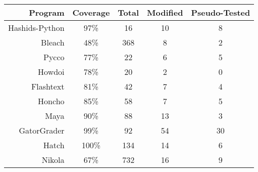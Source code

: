 \renewcommand{\arraystretch}{1.2}

\begin{table}[H]
\centering

%
\huge

\begin{tabular}{rcccc}


  Program & Coverage & Total & Modified & Pseudo-Tested \\
  \toprule

  Hashids-Python & 97\% & 16 & 10 & 8 \\

  Bleach & 48\% & 368 & 8 & 2 \\

  Pycco & 77\% & 22 & 6 & 5 \\

  Howdoi & 78\% & 20 & 2 & 0 \\

  Flashtext & 81\% & 42 & 7 & 4 \\

  Honcho & 85\% & 58 & 7 & 5 \\

  Maya & 90\% & 88 & 13 & 3 \\

  GatorGrader & 99\% & 92 & 54 & 30 \\

  Hatch & 100\% & 134 & 14 & 6 \\

  Nikola & 67\% & 732 & 16 & 9 \\

  \bottomrule

\end{tabular}

\end{table}
